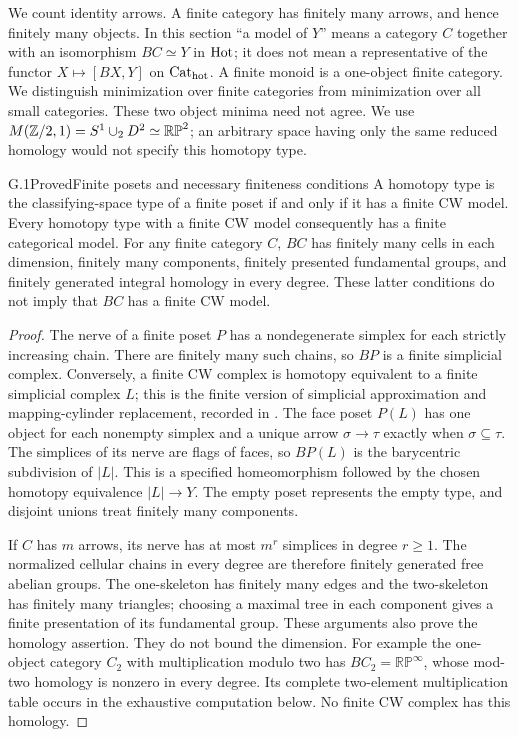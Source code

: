 \label{sec:G}

We count identity arrows. A finite category has finitely many arrows, and hence finitely many objects. In this section ``a model of $Y$'' means a category $C$ together with an isomorphism $BC\simeq Y$ in $\mathrm{Hot}$; it does not mean a representative of the functor $X\mapsto[BX,Y]$ on ${\mathrm{Cat}_{\mathrm{hot}}}$. A finite monoid is a one-object finite category. We distinguish minimization over finite categories from minimization over all small categories. These two object minima need not agree. We use $M(\mathbb Z/2,1)=S^1\cup_2D^2\simeq\mathbb{RP}^2$; an arbitrary space having only the same reduced homology would not specify this homotopy type.

\begin{claim}{G.1}{Proved}{Finite posets and necessary finiteness conditions}
A homotopy type is the classifying-space type of a finite poset if and only if it has a finite CW model. Every homotopy type with a finite CW model consequently has a finite categorical model. For any finite category $C$, $BC$ has finitely many cells in each dimension, finitely many components, finitely presented fundamental groups, and finitely generated integral homology in every degree. These latter conditions do not imply that $BC$ has a finite CW model.
\end{claim}
\begin{proof}
The nerve of a finite poset $P$ has a nondegenerate simplex for each strictly increasing chain. There are finitely many such chains, so $BP$ is a finite simplicial complex. Conversely, a finite CW complex is homotopy equivalent to a finite simplicial complex $L$; this is the finite version of simplicial approximation and mapping-cylinder replacement, recorded in \citet[Theorem 2C.5]{Hatcher2002}. The face poset $P(L)$ has one object for each nonempty simplex and a unique arrow $\sigma\to\tau$ exactly when $\sigma\subseteq\tau$. The simplices of its nerve are flags of faces, so $BP(L)$ is the barycentric subdivision of $|L|$. This is a specified homeomorphism followed by the chosen homotopy equivalence $|L|\to Y$. The empty poset represents the empty type, and disjoint unions treat finitely many components.

If $C$ has $m$ arrows, its nerve has at most $m^r$ simplices in degree $r\geq1$. The normalized cellular chains in every degree are therefore finitely generated free abelian groups. The one-skeleton has finitely many edges and the two-skeleton has finitely many triangles; choosing a maximal tree in each component gives a finite presentation of its fundamental group. These arguments also prove the homology assertion. They do not bound the dimension. For example the one-object category $C_2$ with multiplication modulo two has $BC_2=\mathbb{RP}^{\infty}$, whose mod-two homology is nonzero in every degree. Its complete two-element multiplication table occurs in the exhaustive computation below. No finite CW complex has this homology.
\end{proof}

